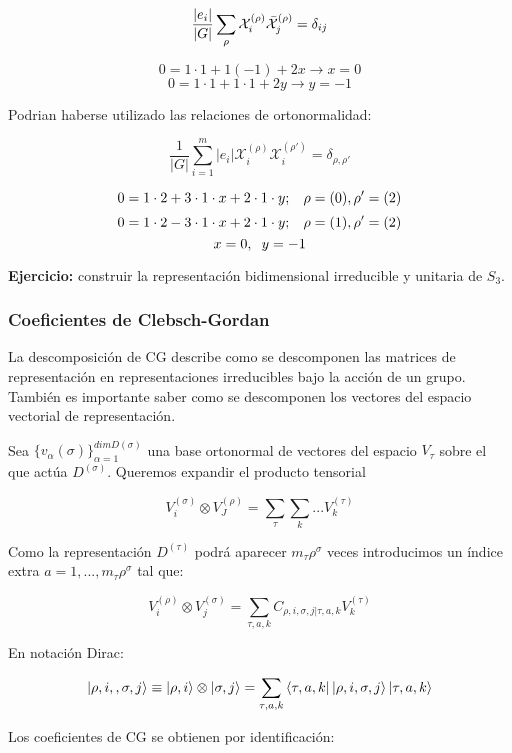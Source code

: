\documentclass{article}
\begin{document}
\begin{itemize}
    $$\frac{|e_i|}{|G|}\sum _\rho \mathcal{X}_i^{(\rho)}\Bar{\mathcal{X}}_j^{(\rho)}=\delta _{ij}$$

    $$0=1\cdot 1+1(-1)+ 2x \to x=0$$
    $$0=1\cdot 1+1\cdot 1 +2y \to y=-1$$

    Podrian haberse utilizado las relaciones de ortonormalidad:

    $$\frac{1}{|G|}\sum _{i=1}^m |e_i|\mathcal{X}_i^{(\rho)}\mathcal{X}_i^{(\rho ')}=\delta _{\rho , \rho '}$$

    $$0=1\cdot 2+3\cdot 1\cdot x+2\cdot 1\cdot y; \hspace{0.3cm} \rho =(0), \rho '=(2)$$
    $$0=1\cdot 2-3\cdot 1\cdot x +2 \cdot 1\cdot y; \hspace{0.3cm} \rho =(1),\rho '=(2)$$
    $$x=0, \hspace{0.2cm} y=-1$$
    \end{itemize}

    \textbf{Ejercicio:} construir la representación bidimensional irreducible y unitaria de $S_3$.

    \newpage

    \subsubsection{Coeficientes de Clebsch-Gordan}
La descomposición de CG describe como se descomponen las matrices de representación en representaciones irreducibles bajo la acción de un grupo. También es importante saber como se descomponen los vectores del espacio vectorial de representación.

Sea $\lbrace v_\alpha (\sigma)\rbrace^{dim D(\sigma)}_{\alpha =1}$ una base ortonormal de vectores del espacio $V_\tau$ sobre el que actúa $D^{(\sigma)}$. Queremos expandir el producto tensorial

$$V_i^{(\sigma)}\otimes V_J^{(\rho)}=\sum _\tau \sum _k ...V_k^{(\tau)}$$

Como la representación $D^{(\tau)}$ podrá aparecer $m_\tau \rho ^\sigma$ veces introducimos un índice extra $a=1,..., m_\tau \rho ^\sigma$ tal que:

$$V_i^{(\rho)}\otimes V_j^{(\sigma)}=\sum _{\tau , a, k}C_{\rho , i, \sigma, j | \tau, a, k}V_k^{(\tau)}$$

En notación Dirac:

$$\ket{\rho, i, ,\sigma , j}\equiv \ket{\rho, i} \otimes \ket{\sigma , j}=\sum _{\tau , a,k}\bra{\tau , a, k}\ket{\rho, i,  \sigma ,j } \ket{\tau , a, k}$$

Los coeficientes de CG se obtienen por identificación:
\end{document}
